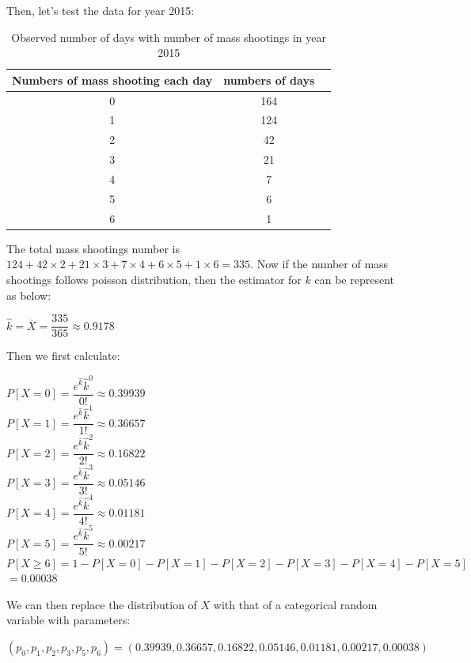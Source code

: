 \documentclass[12pt]{article}
\begin{document}
\par Then, let's test the data for year 2015:
\begin{table} [H]
\begin{center}
\begin{tabular*} {14cm} {@{\extracolsep{\fill} }ccc}
\toprule
Numbers of mass shooting each day & numbers of days \\
\midrule
0 & 164 \\ \hline
1 & 124 \\ \hline
2 & 42\\ \hline
3 & 21 \\ \hline
4 & 7  \\ \hline
5 & 6  \\ \hline
6 & 1  \\
\bottomrule
\end{tabular*}
\end{center}
\caption{Observed number of days with number of mass shootings in year 2015}
\end{table}
\par The total mass shootings number is $124+42\times2+21\times3+7\times4+6\times5+1\times6=335$. Now if the number of mass shootings follows poisson distribution, then the estimator for $k$ can be represent as below:
\begin{center}
$\hat k=\overline X=\dfrac{335}{365} \approx0.9178$
\end{center}
\par Then we first calculate:
\begin{center}
$P[X=0]=\dfrac{e^{\hat k}\hat k^0}{0!} \approx0.39939$\\
$P[X=1]=\dfrac{e^{\hat k}\hat k^1}{1!} \approx0.36657$\\
$P[X=2]=\dfrac{e^{\hat k}\hat k^2}{2!} \approx0.16822$\\
$P[X=3]=\dfrac{e^{\hat k}\hat k^3}{3!} \approx0.05146$\\
$P[X=4]=\dfrac{e^{\hat k}\hat k^4}{4!} \approx0.01181$\\
$P[X=5]=\dfrac{e^{\hat k}\hat k^5}{5!} \approx0.00217$\\
$P[X\geq6]=1-P[X=0]-P[X=1]-P[X=2]-P[X=3]-P[X=4]-P[X=5]$\\
$=0.00038$
\end{center}
\par We can then replace the distribution of $X$ with that of a categorical random variable with parameters:
\begin{center}
$(p_0,p_1,p_2,p_3,p_5,p_6)=(0.39939,0.36657,0.16822,0.05146,0.01181,0.00217,0.00038)$
\end{center}
\end{document}
